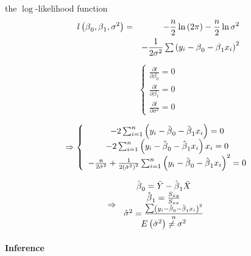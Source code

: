 \documentclass{article}
\begin{document}
the $\log $-likelihood function%
\begin{eqnarray*}
l\left( \beta _{0},\beta _{1},\sigma ^{2}\right) &=&-\frac{n}{2}\ln \left(
2\pi \right) -\frac{n}{2}\ln \sigma ^{2} \\
&&-\frac{1}{2\sigma ^{2}}\tsum \left( y_{i}-\beta _{0}-\beta
_{1}x_{i}\right) ^{2}
\end{eqnarray*}

\begin{equation*}
\left\{ 
\begin{array}{c}
\frac{\partial l}{\partial \beta _{0}}=0 \\ 
\frac{\partial l}{\partial \beta _{1}}=0 \\ 
\frac{\partial l}{\partial \sigma ^{2}}=0%
\end{array}%
\right.
\end{equation*}

\begin{equation*}
\Rightarrow \left\{ 
\begin{array}{c}
-2\tsum_{i=1}^{n}\left( y_{i}-\hat{\beta}_{0}-\hat{\beta}_{1}x_{i}\right) =0
\\ 
-2\tsum_{i=1}^{n}\left( y_{i}-\hat{\beta}_{0}-\hat{\beta}_{1}x_{i}\right)
x_{i}=0 \\ 
-\frac{n}{2\hat{\sigma}^{2}}+\frac{1}{2\left( \hat{\sigma}^{2}\right) ^{2}}%
\tsum_{i=1}^{n}\left( y_{i}-\hat{\beta}_{0}-\hat{\beta}_{1}x_{i}\right)
^{2}=0%
\end{array}%
\right. 
\end{equation*}

\begin{equation*}
\Rightarrow \left. 
\begin{array}{c}
\hat{\beta}_{0}=\bar{Y}-\hat{\beta}_{1}\bar{X} \\ 
\hat{\beta}_{1}=\frac{S_{xy}}{S_{xx}} \\ 
\hat{\sigma}^{2}=\frac{\tsum \left( y_{i}-\hat{\beta}_{0}-\hat{\beta}%
_{1}x_{i}\right) ^{2}}{n} \\ 
E\left( \hat{\sigma}^{2}\right) \neq \sigma ^{2}%
\end{array}%
\right.
\end{equation*}

\bigskip

\paragraph{Inference}
\end{document}
